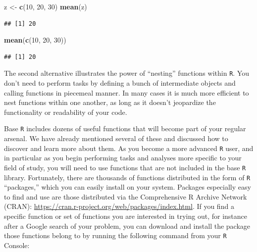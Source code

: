 \documentclass[]{book}
\newenvironment{Shaded}{\begin{snugshade}}{\end{snugshade}}
\newcommand{\DecValTok}[1]{\textcolor[rgb]{0.00,0.00,0.81}{#1}}
\newcommand{\KeywordTok}[1]{\textcolor[rgb]{0.13,0.29,0.53}{\textbf{#1}}}
\newcommand{\NormalTok}[1]{#1}
\newcommand{\StringTok}[1]{\textcolor[rgb]{0.31,0.60,0.02}{#1}}
\begin{document}
\begin{Shaded}
\begin{Highlighting}[]
\NormalTok{z <-}\StringTok{ }\KeywordTok{c}\NormalTok{(}\DecValTok{10}\NormalTok{, }\DecValTok{20}\NormalTok{, }\DecValTok{30}\NormalTok{)}
\KeywordTok{mean}\NormalTok{(z)}
\end{Highlighting}
\end{Shaded}

\begin{verbatim}
## [1] 20
\end{verbatim}

\begin{Shaded}
\begin{Highlighting}[]
\KeywordTok{mean}\NormalTok{(}\KeywordTok{c}\NormalTok{(}\DecValTok{10}\NormalTok{, }\DecValTok{20}\NormalTok{, }\DecValTok{30}\NormalTok{))}
\end{Highlighting}
\end{Shaded}

\begin{verbatim}
## [1] 20
\end{verbatim}

The second alternative illustrates the power of ``nesting'' functions within \texttt{R}. You don't need to perform tasks by defining a bunch of intermediate objects and calling functions in piecemeal manner. In many cases it is much more efficient to nest functions within one another, as long as it doesn't jeopardize the functionality or readability of your code.

Base \texttt{R} includes dozens of useful functions that will become part of your regular arsenal. We have already mentioned several of these and discussed how to discover and learn more about them. As you become a more advanced \texttt{R} user, and in particular as you begin performing tasks and analyses more specific to your field of study, you will need to use functions that are not included in the base \texttt{R} library. Fortunately, there are thousands of functions distributed in the form of \texttt{R} ``packages,'' which you can easily install on your system. Packages especially easy to find and use are those distributed via the Comprehensive R Archive Network (CRAN): \url{https://cran.r-project.org/web/packages/index.html}. If you find a specific function or set of functions you are interested in trying out, for instance after a Google search of your problem, you can download and install the package those functions belong to by running the following command from your \texttt{R} Console:
\end{document}
